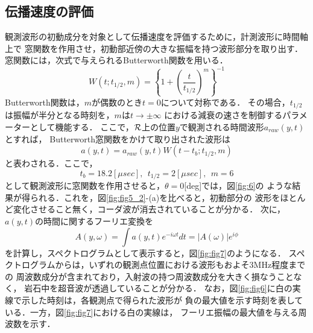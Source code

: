 \subsection{伝播速度の評価}
観測波形の初動成分を対象として伝播速度を評価するために，計測波形に時間軸上で
窓関数を作用させ，初動部近傍の大きな振幅を持つ波形部分を取り出す．
窓関数には，次式で与えられるButterworth関数を用いる．
\begin{equation}
	W(t;t_{1/2},m)=
	\left\{
		1+\left(\frac{t}{t_{1/2}}\right)^m
	\right\}^{-1}
	\label{eqn:Butterworth}
\end{equation}
Butterworth関数は，$m$が偶数のとき$t=0$について対称である．
その場合，$t_{1/2}$は振幅が半分となる時刻を，$m$は$t\rightarrow \pm \infty$
における減衰の速さを制御するパラメーターとして機能する．
ここで，$\cal R$上の位置$y$で観測される時間波形$a_{raw}(y,t)$とすれば，
Butterworth窓関数をかけて取り出された波形は
\begin{equation}
	a(y,t)=a_{raw}(y,t)W(t-t_b;t_{1/2},m)
\end{equation}
と表わされる．ここで，
\[
	t_b=18.2[\mu sec], \ \ t_{1/2}=2[\mu sec], \ \ m=6
\]
として観測波形に窓関数を作用させると，$\theta=0$[deg]では，図\ref{fig:6}の
ような結果が得られる．これを，図\ref{fig:fig5_2}-(a)を比べると，初動部分の
波形をほとんど変化させること無く，コーダ波が消去されていることが分かる．
次に，$a(y,t)$の時間に関するフーリエ変換を
\begin{equation}
	A(y, \omega)=\int a(y, t)e^{-i\omega t}dt=\left| A(\omega) \right|e^{i\phi}
	\label{eqn:def_FFT}
\end{equation}
を計算し，スペクトログラムとして表示すると，図\ref{fig:fig7}のようになる．
スペクトログラムからは，いずれの観測点位置における波形もおよそ3MHz程度までの
周波数成分が含まれており，入射波の持つ周波数成分を大きく損なうことなく，
岩石中を超音波が透過していることが分かる．
なお，図\ref{fig:fig6}に白の実線で示した時刻は，各観測点で得られた波形が
負の最大値を示す時刻を表している．一方，図\ref{fig:fig7}における白の実線は，
フーリエ振幅の最大値を与える周波数を示す．


